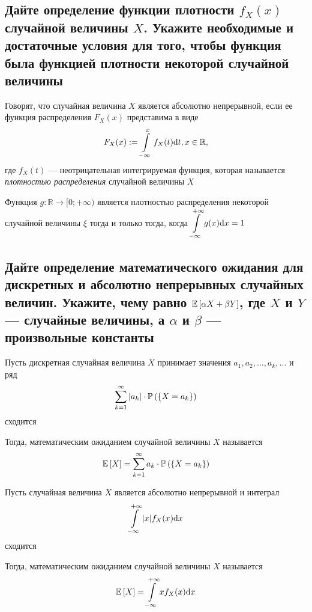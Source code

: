 \documentclass{article}
\begin{document}
\subsection{Дайте определение функции плотности $f_X (x)$ случайной величины $X$. Укажите необходимые и достаточные условия для того, чтобы функция была функцией плотности некоторой случайной величины}
 Говорят, что случайная величина $X$ является абсолютно непрерывной, если ее функция распределения $F_{X}(x)$ представима в виде
\begin{equation*}
    F_X(x):=\int\limits_{-\infty}^{x}f_X(t)\text{d}t,x\in\mathbb{R},
\end{equation*}
где $f_X(t)$ — неотрицательная интегрируемая функция, которая называется \textit{плотностью распределения} случайной величины $X$

\theorem Функция $g:\mathbb{R}\to[0;+\infty)$ является плотностью распределения некоторой случайной величины $\xi$ тогда и только тогда, когда $\displaystyle\int\limits_{-\infty}^{+\infty} g(x)\text{d}x=1$

\subsection{Дайте определение математического ожидания для дискретных и абсолютно непрерывных случайных величин. Укажите, чему равно $\mathbb{E}\left[\alpha X+\beta Y\right]$, где $X$ и $Y$ — случайные величины, а $\alpha$ и $\beta$ — произвольные константы}
 Пусть дискретная случайная величина $X$ принимает значения $a_1,a_2,\ldots,a_k,\ldots$ и ряд 
\begin{equation*}
    \sum_{k=1}^{\infty}|a_k|\cdot\prob{X=a_k}
\end{equation*}
сходится

Тогда, математическим ожиданием случайной величины $X$ называется
\begin{equation*}
    \matwait{X}=\sum_{k=1}^{\infty}a_k\cdot\prob{X=a_k}
\end{equation*}

 Пусть случайная величина $X$ является абсолютно непрерывной и интеграл
\begin{equation*}
    \int\limits_{-\infty}^{+\infty}|x|f_{X}(x)\text{d}x
\end{equation*}
сходится

Тогда, математическим ожиданием случайной величины $X$ называется 
\begin{equation*}
    \mathbb{E}\left[X\right]=\int\limits_{-\infty}^{+\infty}xf_X(x)\text{d}x
\end{equation*}
\end{document}
